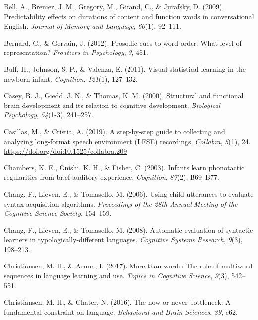 \documentclass[
  english,
  man,mask,floatsintext]{apa6}
\begin{document}
\leavevmode\hypertarget{ref-bell2009predictability}{}%
Bell, A., Brenier, J. M., Gregory, M., Girand, C., \& Jurafsky, D. (2009). Predictability effects on durations of content and function words in conversational English. \emph{Journal of Memory and Language}, \emph{60}(1), 92--111.

\leavevmode\hypertarget{ref-bernard2012prosodic}{}%
Bernard, C., \& Gervain, J. (2012). Prosodic cues to word order: What level of representation? \emph{Frontiers in Psychology}, \emph{3}, 451.

\leavevmode\hypertarget{ref-bulf2011visual}{}%
Bulf, H., Johnson, S. P., \& Valenza, E. (2011). Visual statistical learning in the newborn infant. \emph{Cognition}, \emph{121}(1), 127--132.

\leavevmode\hypertarget{ref-casey2000structural}{}%
Casey, B. J., Giedd, J. N., \& Thomas, K. M. (2000). Structural and functional brain development and its relation to cognitive development. \emph{Biological Psychology}, \emph{54}(1-3), 241--257.

\leavevmode\hypertarget{ref-casillas2019step}{}%
Casillas, M., \& Cristia, A. (2019). A step-by-step guide to collecting and analyzing long-format speech environment (LFSE) recordings. \emph{Collabra}, \emph{5}(1), 24. \url{https://doi.org/doi:10.1525/collabra.209}

\leavevmode\hypertarget{ref-chambers2003infants}{}%
Chambers, K. E., Onishi, K. H., \& Fisher, C. (2003). Infants learn phonotactic regularities from brief auditory experience. \emph{Cognition}, \emph{87}(2), B69--B77.

\leavevmode\hypertarget{ref-chang2006using}{}%
Chang, F., Lieven, E., \& Tomasello, M. (2006). Using child utterances to evaluate syntax acquisition algorithms. \emph{Proceedings of the 28th Annual Meeting of the Cognitive Science Society}, 154--159.

\leavevmode\hypertarget{ref-chang2008automatic}{}%
Chang, F., Lieven, E., \& Tomasello, M. (2008). Automatic evaluation of syntactic learners in typologically-different languages. \emph{Cognitive Systems Research}, \emph{9}(3), 198--213.

\leavevmode\hypertarget{ref-christiansen2017more}{}%
Christiansen, M. H., \& Arnon, I. (2017). More than words: The role of multiword sequences in language learning and use. \emph{Topics in Cognitive Science}, \emph{9}(3), 542--551.

\leavevmode\hypertarget{ref-christiansen2016now}{}%
Christiansen, M. H., \& Chater, N. (2016). The now-or-never bottleneck: A fundamental constraint on language. \emph{Behavioral and Brain Sciences}, \emph{39}, e62.
\end{document}
